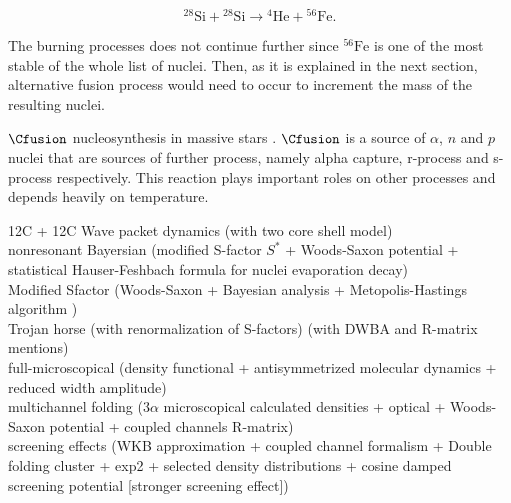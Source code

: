 \documentclass[openany]{book}
\begin{document}
\begin{equation} \label{eq:reaction_28Sifusion_alpha56Fe}
	\mathrm{{}^{28}Si + {}^{28}Si \rightarrow {}^{4}He + {}^{56}Fe }.
\end{equation}

The burning processes does not continue further since $\mathrm{^{56}Fe }$ is one of the most stable of the whole list of nuclei. Then, as it is explained in the next section, alternative fusion process would need to occur to increment the mass of the resulting nuclei.

$\Cfusion$ nucleosynthesis in massive stars \cite{pignatari_hirschi_wiescher_gallino_bennett_beard_fryer_herwig_rockefeller_timmes_et_2012}. $\Cfusion$ is a source of $\alpha$, $n$ and $p$ nuclei that are sources of further process, namely alpha capture, r-process and s-process respectively. 
This reaction plays important roles on other processes and depends heavily on temperature.

12C + 12C Wave packet dynamics (with two core shell model) \cite{diaz-torres_wiescher_2018} \\

nonresonant Bayersian (modified S-factor $S^{*}$ + Woods-Saxon potential + statistical Hauser-Feshbach formula for nuclei evaporation decay)\cite{li_fang_bucher_li_ru_tang_2020} \\

Modified Sfactor (Woods-Saxon + Bayesian analysis + Metopolis-Hastings algorithm ) \cite{luo_wen_lin_yang_jia_yang_huang_chang_zhang_yang_et_2022} \\

Trojan horse (with renormalization of S-factors) \cite{mukhamedzhanov_pang_kadyrov_2019}
 (with DWBA and R-matrix mentions) \cite{mukhamedzanov_2022} \\
  
full-microscopical (density functional +  antisymmetrized molecular dynamics + reduced width amplitude) \cite{taniguchi_kimura_2021} \\

multichannel folding ($3\alpha$ microscopical calculated densities + optical + Woods-Saxon potential + coupled channels R-matrix) \cite{assuncao_descouvemont_2016} \\

screening effects (WKB approximation + coupled channel formalism + Double folding cluster + exp2 + selected density distributions + cosine damped screening potential [stronger screening effect]) \cite{koyuncu_soylu_2018} \\
\end{document}
